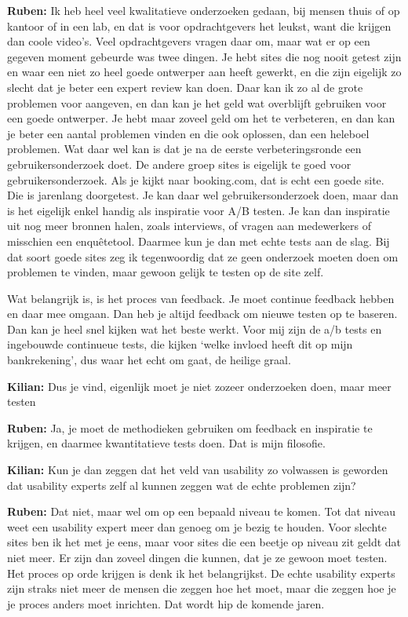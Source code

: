 \textbf{Ruben:} Ik heb heel veel kwalitatieve onderzoeken gedaan, bij mensen thuis of op kantoor of in een lab, en dat is voor opdrachtgevers het leukst, want die krijgen dan coole video's. Veel opdrachtgevers vragen daar om, maar wat er op een gegeven moment gebeurde was twee dingen. Je hebt sites die nog nooit getest zijn en waar een niet zo heel goede ontwerper aan heeft gewerkt, en die zijn eigelijk zo slecht dat je beter een expert review kan doen. Daar kan ik zo al de grote problemen voor aangeven, en dan kan je het geld wat overblijft gebruiken voor een goede ontwerper. Je hebt maar zoveel geld om het te verbeteren, en dan kan je beter een aantal problemen vinden en die ook oplossen, dan een heleboel problemen. Wat daar wel kan is dat je na de eerste verbeteringsronde een gebruikersonderzoek doet. De andere groep sites is eigelijk te goed voor gebruikersonderzoek. Als je kijkt naar booking.com, dat is echt een goede site. Die is jarenlang doorgetest. Je kan daar wel gebruikersonderzoek doen, maar dan is het eigelijk enkel handig als inspiratie voor A/B testen. Je kan dan inspiratie uit nog meer bronnen halen, zoals interviews, of vragen aan medewerkers of misschien een enqu\^etetool. Daarmee kun je dan met echte tests aan de slag. Bij dat soort goede sites zeg ik tegenwoordig dat ze geen onderzoek moeten doen om problemen te vinden, maar gewoon gelijk te testen op de site zelf.

Wat belangrijk is, is het proces van feedback. Je moet continue feedback hebben en daar mee omgaan. Dan heb je altijd feedback om nieuwe testen op te baseren. Dan kan je heel snel kijken wat het beste werkt. Voor mij zijn de a/b tests en ingebouwde continueue tests, die kijken `welke invloed heeft dit op mijn bankrekening', dus waar het echt om gaat, de heilige graal.

\textbf{Kilian:} Dus je vind, eigenlijk moet je niet zozeer onderzoeken doen, maar meer testen

\textbf{Ruben:} Ja, je moet de methodieken gebruiken om feedback en inspiratie te krijgen, en daarmee kwantitatieve tests doen. Dat is mijn filosofie.

\textbf{Kilian:} Kun je dan zeggen dat het veld van usability zo volwassen is geworden dat usability experts zelf al kunnen zeggen wat de echte problemen zijn?

\textbf{Ruben:} Dat niet, maar wel om op een bepaald niveau te komen. Tot dat niveau weet een usability expert meer dan genoeg om je bezig te houden. Voor slechte sites ben ik het met je eens, maar voor sites die een beetje op niveau zit geldt dat niet meer. Er zijn dan zoveel dingen die kunnen, dat je ze gewoon moet testen. Het proces op orde krijgen is denk ik het belangrijkst. De echte usability experts zijn straks niet meer de mensen die zeggen hoe het moet, maar die zeggen hoe je je proces anders moet inrichten. Dat wordt hip de komende jaren.

